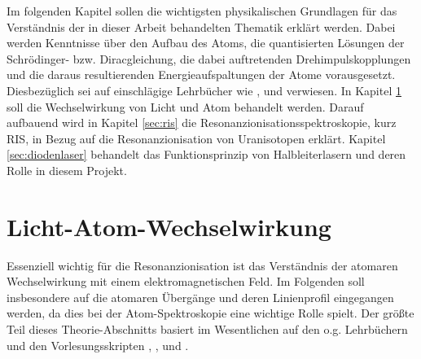 Im folgenden Kapitel sollen die wichtigsten physikalischen Grundlagen für das
Verständnis der in dieser Arbeit behandelten Thematik erklärt werden. Dabei
werden Kenntnisse über den Aufbau des Atoms, die quantisierten Lösungen der
Schrödinger- bzw. Diracgleichung, die dabei auftretenden Drehimpulskopplungen
und die daraus resultierenden Energieaufspaltungen der Atome vorausgesetzt.
Diesbezüglich sei auf einschlägige Lehrbücher wie
\cite{demtroeder:ex3}, \cite{demtroeder:laserspektroskopie} und \cite{saleh:grundlagen_der_photonik}
verwiesen. In Kapitel \ref{sec:licht-atom-wechselwirkung} soll die
Wechselwirkung von Licht und Atom behandelt werden. Darauf aufbauend wird
in Kapitel \ref{sec:ris} die Resonanzionisationsspektroskopie,
kurz RIS, in Bezug auf die Resonanzionisation von Uranisotopen erklärt. Kapitel
\ref{sec:diodenlaser} behandelt das Funktionsprinzip von Halbleiterlasern und
deren Rolle in diesem Projekt.

\section{Licht-Atom-Wechselwirkung}\label{sec:licht-atom-wechselwirkung}
Essenziell wichtig für die Resonanzionisation ist das Verständnis der atomaren
Wechselwirkung mit einem elektromagnetischen Feld. Im Folgenden soll insbesondere auf die
atomaren Übergänge und deren Linienprofil eingegangen werden, da dies bei der
Atom-Spektroskopie eine wichtige Rolle spielt. Der größte Teil dieses
Theorie-Abschnitts basiert im Wesentlichen auf den o.g. Lehrbüchern und den
Vorlesungsskripten \cite{bloch:atomphysik},
\cite{rauschenbeutel:atomphysik}, \cite{rauschenbeutel:quantenoptik} und
\cite{kuhr:quantenoptik}.



